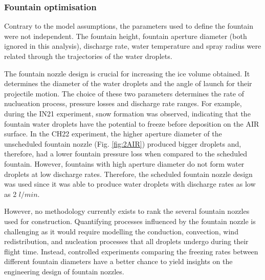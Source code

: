 \documentclass[tc, manuscript]{copernicus}
\begin{document}
%

\subsubsection{Fountain optimisation}

Contrary to the model assumptions, the parameters used to define the fountain were not independent. The fountain
height, fountain aperture diameter (both ignored in this analysis), discharge rate, water temperature and spray
radius were related through the trajectories of the water droplets.

The fountain nozzle design is crucial for increasing the ice volume obtained. It determines the diameter of the
water droplets and the angle of launch for their projectile motion. The choice of these two parameters
determines the rate of nuclueation process, pressure losses and discharge rate ranges. For example, during the
IN21 experiment, snow formation was observed, indicating that the fountain water droplets have the potential to
freeze before deposition on the AIR surface. In the CH22 experiment, the higher aperture diameter of the
unscheduled fountain nozzle (Fig. \ref{fig:2AIR}) produced bigger droplets and, therefore, had a lower fountain
pressure loss when compared to the scheduled fountain. However, fountains with high aperture diameter do not
form water droplets at low discharge rates. Therefore, the scheduled fountain nozzle design was used since it
was able to produce water droplets with discharge rates as low as 2 $l/min$.

However, no methodology currently exists to rank the several fountain nozzles used for construction. Quantifying
processes influenced by the fountain nozzle is challenging as it would require modelling the conduction,
convection, wind redistribution, and nucleation processes that all droplets undergo during their flight time.
Instead, controlled experiments comparing the freezing rates between different fountain diameters have a better
chance to yield insights on the engineering design of fountain nozzles.
\end{document}
